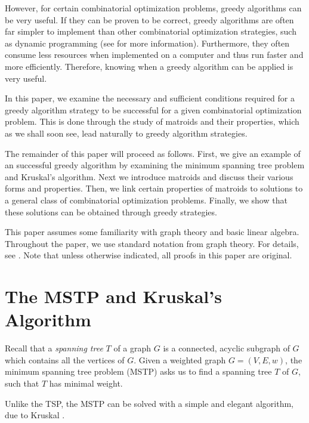 \documentclass[a4paper,11pt]{report}
\theoremstyle{plain}
\theoremstyle{definition}
\begin{document}

However, for certain combinatorial optimization problems, greedy algorithms can
be very useful. If they can be proven to be correct, greedy algorithms are
often far simpler to implement than other combinatorial optimization
strategies, such as dynamic programming (see \cite[pp. 378--387]{clrs} for more
information). Furthermore, they often consume less resources when implemented
on a computer and thus run faster and more efficiently. Therefore, knowing when
a greedy algorithm can be applied is very useful.

In this paper, we examine the necessary and sufficient conditions required for
a greedy algorithm strategy to be successful for a given combinatorial
optimization problem. This is done through the study of matroids and their
properties, which as we shall soon see, lead naturally to greedy algorithm
strategies.

The remainder of this paper will proceed as follows. First, we give an example
of an successful greedy algorithm by examining the minimum spanning tree
problem and Kruskal's algorithm. Next we introduce matroids and discuss their
various forms and properties. Then, we link certain properties of matroids to
solutions to a general class of combinatorial optimization problems. Finally,
we show that these solutions can be obtained through greedy strategies.

This paper assumes some familiarity with graph theory and basic linear
algebra. Throughout the paper, we use standard notation from graph theory.
For details, see \cite[pp. 1--6]{matroid-theory}. Note that unless otherwise
indicated, all proofs in this paper are original.


\section{The MSTP and Kruskal's Algorithm}

Recall that a \emph{spanning tree} $T$ of a graph $G$ is a connected, acyclic
subgraph of $G$ which contains all the vertices of $G$. Given a weighted graph
$G = (V,E,w)$, the minimum spanning tree problem (MSTP) asks us to find a
spanning tree $T$ of $G$, such that $T$ has minimal weight.

Unlike the TSP, the MSTP can be solved with a simple and elegant algorithm, due
to Kruskal \cite[pp. 631--633]{clrs}.

\end{document}
